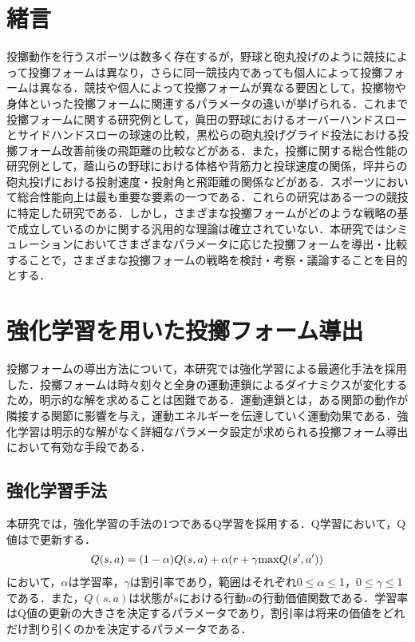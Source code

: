 \begin{small}

\section{緒言}
投擲動作を行うスポーツは数多く存在するが，野球と砲丸投げのように競技によって投擲フォームは異なり，さらに同一競技内であっても個人によって投擲フォームは異なる．競技や個人によって投擲フォームが異なる要因として，投擲物や身体といった投擲フォームに関連するパラメータの違いが挙げられる．これまで投擲フォームに関する研究例として，眞田の野球におけるオーバーハンドスローとサイドハンドスローの球速の比較\cite{sanada}，黒松らの砲丸投げグライド投法における投擲フォーム改善前後の飛距離の比較\cite{kuromatsu}などがある．また，投擲に関する総合性能の研究例として，蔭山らの野球における体格や背筋力と投球速度の関係\cite{kageyama}，坪井らの砲丸投げにおける投射速度・投射角と飛距離の関係\cite{tsuboi}などがある．スポーツにおいて総合性能向上は最も重要な要素の一つである．これらの研究はある一つの競技に特定した研究である．しかし，さまざまな投擲フォームがどのような戦略の基で成立しているのかに関する汎用的な理論は確立されていない．本研究ではシミュレーションにおいてさまざまなパラメータに応じた投擲フォームを導出・比較することで，さまざまな投擲フォームの戦略を検討・考察・議論することを目的とする．\\
\section{強化学習を用いた投擲フォーム導出}
投擲フォームの導出方法について，本研究では強化学習による最適化手法を採用した．投擲フォームは時々刻々と全身の運動連鎖\cite{burkhart}によるダイナミクスが変化するため，明示的な解を求めることは困難である．運動連鎖とは，ある関節の動作が隣接する関節に影響を与え，運動エネルギーを伝達していく運動効果である．強化学習は明示的な解がなく詳細なパラメータ設定が求められる投擲フォーム導出において有効な手段である．
\subsection{強化学習手法}
本研究では，強化学習の手法の1つであるQ学習\cite{watkins}を採用する．Q学習において，Q値はで更新する．
\begin{eqnarray}
  \equlabel{1}
  Q(s,a)=(1-\alpha)Q(s,a)+\alpha(r+\gamma \mathrm{max}Q(s',a'))
\end{eqnarray}
において，$\alpha$は学習率，$\gamma$は割引率であり，範囲はそれぞれ0$\leq$$\alpha$$\leq$1，0$\leq$$\gamma$$\leq$1である．また，$Q(s,a)$は状態が$s$における行動$a$の行動価値関数である．学習率はQ値の更新の大きさを決定するパラメータであり，割引率は将来の価値をどれだけ割り引くのかを決定するパラメータである．

\end{small}

